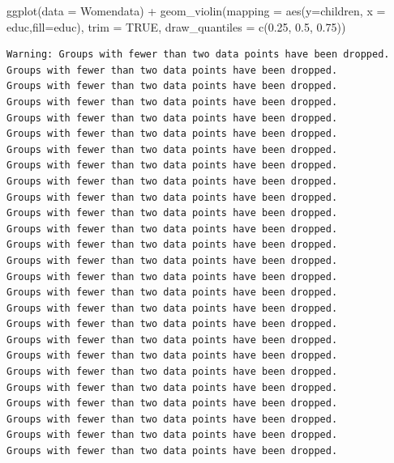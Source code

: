 \documentclass[
  letterpaper,
  DIV=11,
  numbers=noendperiod]{scrartcl}
\newenvironment{Shaded}{\begin{snugshade}}{\end{snugshade}}
\newcommand{\AttributeTok}[1]{\textcolor[rgb]{0.40,0.45,0.13}{#1}}
\newcommand{\ConstantTok}[1]{\textcolor[rgb]{0.56,0.35,0.01}{#1}}
\newcommand{\FloatTok}[1]{\textcolor[rgb]{0.68,0.00,0.00}{#1}}
\newcommand{\FunctionTok}[1]{\textcolor[rgb]{0.28,0.35,0.67}{#1}}
\newcommand{\NormalTok}[1]{\textcolor[rgb]{0.00,0.23,0.31}{#1}}
\newcommand{\SpecialCharTok}[1]{\textcolor[rgb]{0.37,0.37,0.37}{#1}}
\begin{document}
\begin{Shaded}
\begin{Highlighting}[]
\FunctionTok{ggplot}\NormalTok{(}\AttributeTok{data =}\NormalTok{ Womendata) }\SpecialCharTok{+} 
  \FunctionTok{geom\_violin}\NormalTok{(}\AttributeTok{mapping =} \FunctionTok{aes}\NormalTok{(}\AttributeTok{y=}\NormalTok{children, }\AttributeTok{x =}\NormalTok{ educ,}\AttributeTok{fill=}\NormalTok{educ), }\AttributeTok{trim =} \ConstantTok{TRUE}\NormalTok{, }\AttributeTok{draw\_quantiles =} \FunctionTok{c}\NormalTok{(}\FloatTok{0.25}\NormalTok{, }\FloatTok{0.5}\NormalTok{, }\FloatTok{0.75}\NormalTok{))}
\end{Highlighting}
\end{Shaded}

\begin{verbatim}
Warning: Groups with fewer than two data points have been dropped.
Groups with fewer than two data points have been dropped.
Groups with fewer than two data points have been dropped.
Groups with fewer than two data points have been dropped.
Groups with fewer than two data points have been dropped.
Groups with fewer than two data points have been dropped.
Groups with fewer than two data points have been dropped.
Groups with fewer than two data points have been dropped.
Groups with fewer than two data points have been dropped.
Groups with fewer than two data points have been dropped.
Groups with fewer than two data points have been dropped.
Groups with fewer than two data points have been dropped.
Groups with fewer than two data points have been dropped.
Groups with fewer than two data points have been dropped.
Groups with fewer than two data points have been dropped.
Groups with fewer than two data points have been dropped.
Groups with fewer than two data points have been dropped.
Groups with fewer than two data points have been dropped.
Groups with fewer than two data points have been dropped.
Groups with fewer than two data points have been dropped.
Groups with fewer than two data points have been dropped.
Groups with fewer than two data points have been dropped.
Groups with fewer than two data points have been dropped.
Groups with fewer than two data points have been dropped.
Groups with fewer than two data points have been dropped.
Groups with fewer than two data points have been dropped.
\end{verbatim}
\end{document}
